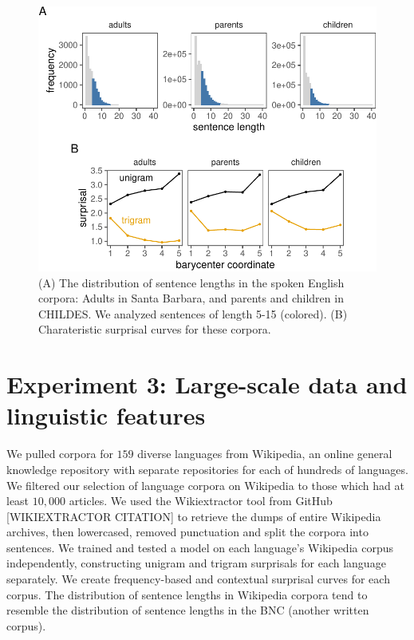 \documentclass[10pt, letterpaper]{article}
\newenvironment{CodeChunk}{}{}
\begin{document}
\begin{CodeChunk}
\begin{figure}[tb]

{\centering \includegraphics{figs/spoken_figs-1} 

}

\caption[(A) The distribution of sentence lengths in the spoken English corpora]{(A) The distribution of sentence lengths in the spoken English corpora: Adults in Santa Barbara, and parents and children in CHILDES. We analyzed sentences of length 5-15 (colored). (B) Charateristic surprisal curves for these corpora.}\label{fig:spoken_figs}
\end{figure}
\end{CodeChunk}

\hypertarget{experiment-3-large-scale-data-and-linguistic-features}{%
\section{Experiment 3: Large-scale data and linguistic
features}\label{experiment-3-large-scale-data-and-linguistic-features}}

We pulled corpora for \(159\) diverse languages from Wikipedia, an
online general knowledge repository with separate repositories for each
of hundreds of languages. We filtered our selection of language corpora
on Wikipedia to those which had at least \(10,000\) articles. We used
the Wikiextractor tool from GitHub {[}WIKIEXTRACTOR CITATION{]} to
retrieve the dumps of entire Wikipedia archives, then lowercased,
removed punctuation and split the corpora into sentences. We trained and
tested a model on each language's Wikipedia corpus independently,
constructing unigram and trigram surprisals for each language
separately. We create frequency-based and contextual surprisal curves
for each corpus. The distribution of sentence lengths in Wikipedia
corpora tend to resemble the distribution of sentence lengths in the BNC
(another written corpus).
\end{document}
